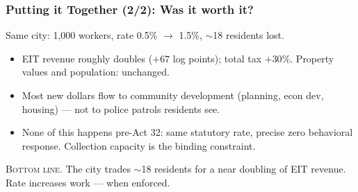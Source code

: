 \documentclass[xcolor = x11names, compress, aspectratio = 169]{beamer}
\renewcommand{\(}{\begin{columns}}
\renewcommand{\)}{\end{columns}}
\newcommand{\<}[1]{\begin{column}{#1}}
\renewcommand{\>}{\end{column}}
\begin{document}
\begin{frame}
\frametitle{Putting it Together (2/2): Was it worth it?}
    \small
    Same city: 1{,}000 workers, rate 0.5\% $\rightarrow$ 1.5\%, $\sim$18 residents lost.
    \vspace{0.2cm}
    \begin{itemize}\setlength{\itemsep}{0.15cm}
        \item[Fiscal.] EIT revenue roughly doubles ($+67$ log points);
        total tax $+30\%$. Property values and population: unchanged.
        \item[Q7.] Most new dollars flow to community development
        (planning, econ dev, housing) --- not to police patrols residents see.
        \item[Enforcement.] None of this happens pre-Act 32: same statutory
        rate, precise zero behavioral response. Collection capacity is the
        binding constraint.
    \end{itemize}
    \vspace{0.3cm}
    \textsc{Bottom line.} The city trades $\sim$18 residents for a near
    doubling of EIT revenue. Rate increases work --- when enforced.
\end{frame}
\fi %
\end{document}
